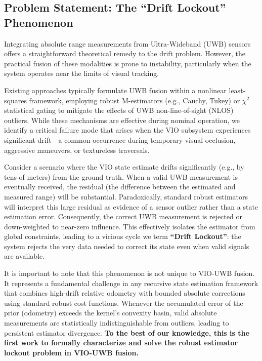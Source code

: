 \documentclass{svproc}
\begin{document}
\subsection{Problem Statement: The ``Drift Lockout'' Phenomenon}

Integrating absolute range measurements from Ultra-Wideband (UWB) sensors offers a straightforward theoretical remedy to the drift problem. However, the practical fusion of these modalities is prone to instability, particularly when the system operates near the limits of visual tracking.

Existing approaches typically formulate UWB fusion within a nonlinear least-squares framework, employing robust M-estimators (e.g., Cauchy, Tukey) or $\chi^2$ statistical gating to mitigate the effects of UWB non-line-of-sight (NLOS) outliers. While these mechanisms are effective during nominal operation, we identify a critical failure mode that arises when the VIO subsystem experiences significant drift—a common occurrence during temporary visual occlusion, aggressive maneuvers, or textureless traversals.

Consider a scenario where the VIO state estimate drifts significantly (e.g., by tens of meters) from the ground truth. When a valid UWB measurement is eventually received, the residual (the difference between the estimated and measured range) will be substantial. Paradoxically, standard robust estimators will interpret this large residual as evidence of a sensor outlier rather than a state estimation error. Consequently, the correct UWB measurement is rejected or down-weighted to near-zero influence. This effectively isolates the estimator from global constraints, leading to a vicious cycle we term \textbf{``Drift Lockout''}: the system rejects the very data needed to correct its state even when valid signals are available.

It is important to note that this phenomenon is not unique to VIO-UWB fusion. It represents a fundamental challenge in any recursive state estimation framework that combines high-drift relative odometry with bounded absolute corrections using standard robust cost functions. Whenever the accumulated error of the prior (odometry) exceeds the kernel's convexity basin, valid absolute measurements are statistically indistinguishable from outliers, leading to persistent estimator divergence. \textbf{To the best of our knowledge, this is the first work to formally characterize and solve the robust estimator lockout problem in VIO-UWB fusion.}
\end{document}
